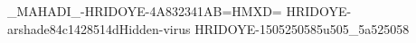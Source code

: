_MAHADI_-HRIDOYE-4A832341AB=HMXD=
HRIDOYE-arshade84c1428514dHidden-virus
HRIDOYE-1505250585u505_5a525058
